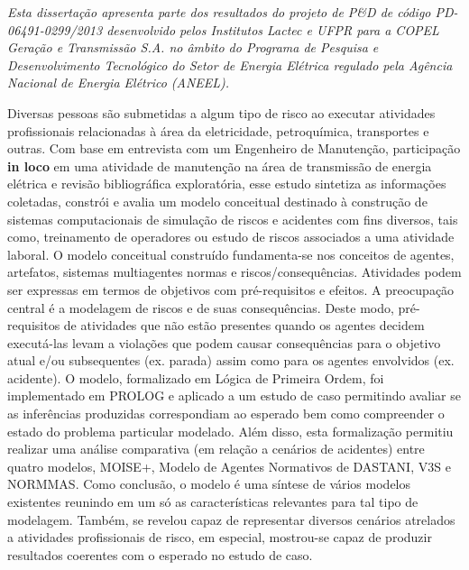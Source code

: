 \textit{Esta dissertação apresenta parte dos resultados do projeto de P&D de código PD-06491-0299/2013 desenvolvido pelos Institutos Lactec e UFPR para a COPEL Geração e Transmissão S.A. no âmbito do Programa de Pesquisa e Desenvolvimento Tecnológico do Setor de Energia Elétrica regulado pela Agência Nacional de Energia Elétrico (ANEEL).}

Diversas pessoas são submetidas a algum tipo de risco ao executar atividades profissionais relacionadas à área da eletricidade, petroquímica, transportes e outras. Com base em entrevista com um Engenheiro de Manutenção, participação \textbf{in loco} em uma atividade de manutenção na área de transmissão de energia elétrica e revisão bibliográfica exploratória, esse estudo sintetiza as informações coletadas, constrói e avalia um modelo conceitual destinado à construção de sistemas computacionais de simulação de riscos e acidentes com fins diversos, tais como, treinamento de operadores ou estudo de riscos associados a uma atividade laboral. O modelo conceitual construído fundamenta-se nos conceitos de agentes, artefatos, sistemas multiagentes normas e riscos/consequências. Atividades podem ser expressas em termos de objetivos com pré-requisitos e efeitos. A preocupação central é a modelagem de riscos e de suas consequências. Deste modo, pré-requisitos de atividades que não estão presentes quando os agentes decidem executá-las levam a violações que podem causar consequências para o objetivo atual e/ou subsequentes (ex. parada) assim como para os agentes envolvidos (ex. acidente). O modelo, formalizado em Lógica de Primeira Ordem, foi implementado em PROLOG e aplicado a um estudo de caso permitindo avaliar se as inferências produzidas correspondiam ao esperado bem como compreender o estado do problema particular modelado. Além disso, esta formalização permitiu realizar uma análise comparativa (em relação a cenários de acidentes) entre quatro modelos, MOISE+, Modelo de Agentes Normativos de DASTANI, V3S e NORMMAS. Como conclusão, o modelo é uma síntese de vários modelos existentes reunindo em um só as características relevantes para tal tipo de modelagem. Também, se revelou capaz de representar diversos cenários atrelados a atividades profissionais de risco, em especial, mostrou-se capaz de produzir resultados coerentes com o esperado no estudo de caso.
